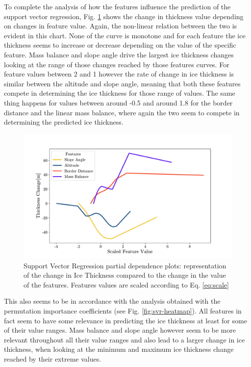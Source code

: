 To complete the analysis of how the features influence the prediction of the support vector regression, Fig. \ref{fig:svr-pdp} shows the change in thickness value depending on changes in feature value. Again, the non-linear relation between the two is evident in this chart.  None of the curve is monotone and for each feature the ice thickness seems to increase or decrease depending on the value of the specific feature. Mass balance and slope angle drive the largest ice thickness changes looking at the range of those changes reached by those features curves. For feature values between 2 and 1 however the rate of change in ice thickness is similar between the altitude and slope angle, meaning that both these features compete in determining the ice thickness for those range of values. The same thing happens for values between around -0.5 and around 1.8 for the border distance and the linear mass balance, where again the two seem to compete in determining the predicted ice thickness.
\begin{figure}[!tp]
	\centering		  
	\includegraphics[width=1.\textwidth]{figures/SVR_pdp.pdf}
	\caption{Support Vector Regression partial dependence plots: representation of the change in Ice Thickness compared to the change in the value of the features. Features values are scaled according to Eq. \ref{eq:scale}}
	\label{fig:svr-pdp}
\end{figure}

This also seems to be in accordance with the analysis obtained with the permutation importance coefficients (see Fig. \ref{fig:svr-heatmap}). All features in fact seem to have some relevance in predicting the ice thickness at least for some of their value ranges. Mass balance and slope angle however seem to be more relevant throughout all their value ranges and also lead to a larger change in ice thickness, when looking at the minimum and maximum ice thickness change reached by their extreme values. 


